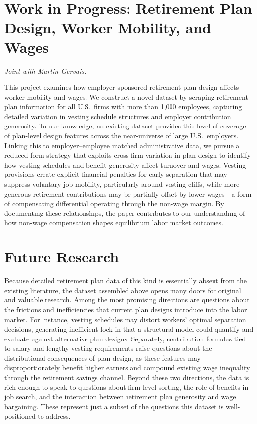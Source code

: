 \documentclass[12pt]{article}
\begin{document}
\section{Work in Progress: Retirement Plan Design, Worker Mobility, and Wages}

\textit{Joint with Martin Gervais.}

\medskip

This project examines how employer-sponsored retirement plan design affects
worker mobility and wages.
We construct a novel dataset by scraping retirement plan information for all
U.S.\ firms with more than 1{,}000 employees, capturing detailed variation
in vesting schedule structures and employer contribution generosity.
To our knowledge, no existing dataset provides this level of coverage of
plan-level design features across the near-universe of large U.S.\ employers.
Linking this to employer--employee matched administrative data, we pursue a
reduced-form strategy that exploits cross-firm variation in plan design to
identify how vesting schedules and benefit generosity affect turnover and wages.
Vesting provisions create explicit financial penalties for early separation
that may suppress voluntary job mobility, particularly around vesting cliffs,
while more generous retirement contributions may be partially offset by lower
wages---a form of compensating differential operating through the non-wage
margin.
By documenting these relationships, the paper contributes to our understanding
of how non-wage compensation shapes equilibrium labor market outcomes.

\section{Future Research}

Because detailed retirement plan data of this kind is essentially absent from
the existing literature, the dataset assembled above opens many doors for
original and valuable research.
Among the most promising directions are questions about the frictions and
inefficiencies that current plan designs introduce into the labor market.
For instance, vesting schedules may distort workers' optimal separation
decisions, generating inefficient lock-in that a structural model could
quantify and evaluate against alternative plan designs.
Separately, contribution formulas tied to salary and lengthy vesting
requirements raise questions about the distributional consequences of plan
design, as these features may disproportionately benefit higher earners and
compound existing wage inequality through the retirement savings channel.
Beyond these two directions, the data is rich enough to speak to questions
about firm-level sorting, the role of benefits in job search, and the
interaction between retirement plan generosity and wage bargaining.
These represent just a subset of the questions this dataset is well-positioned
to address.
\end{document}
